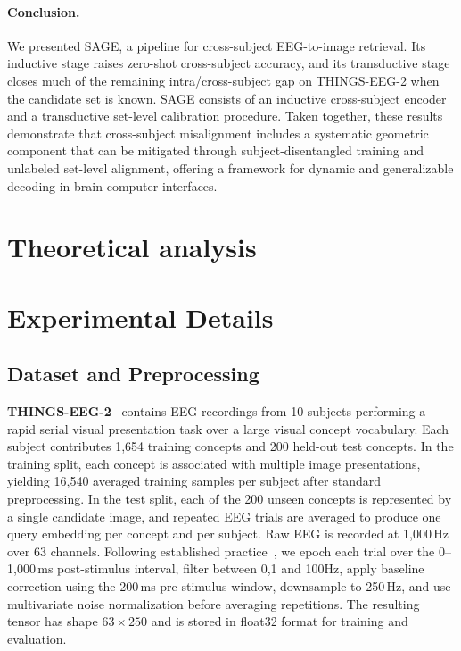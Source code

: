 \documentclass{article}
\begin{document}
\paragraph{Conclusion.}
We presented SAGE, a pipeline for cross-subject EEG-to-image retrieval. Its inductive stage raises zero-shot cross-subject accuracy, and its transductive stage closes much of the remaining intra/cross-subject gap on THINGS-EEG-2 when the candidate set is known. SAGE consists of an inductive cross-subject encoder and a transductive set-level calibration procedure. Taken together, these results demonstrate that cross-subject misalignment includes a systematic geometric component that can be mitigated through subject-disentangled training and unlabeled set-level alignment, offering a framework for dynamic and generalizable decoding in brain-computer interfaces.

\newpage



\newpage


\appendix


\section{Theoretical analysis}


\section{Experimental Details}
\label{app:exp-details}

\subsection{Dataset and Preprocessing}
\label{app:dataset-details}

\textbf{THINGS-EEG-2}~\cite{gifford2022things} contains EEG recordings from 10 subjects performing a rapid serial visual presentation task over a large visual concept vocabulary. Each subject contributes 1{,}654 training concepts and 200 held-out test concepts. In the training split, each concept is associated with multiple image presentations, yielding 16{,}540 averaged training samples per subject after standard preprocessing. In the test split, each of the 200 unseen concepts is represented by a single candidate image, and repeated EEG trials are averaged to produce one query embedding per concept and per subject. Raw EEG is recorded at 1{,}000\,Hz over 63 channels. Following established practice~\cite{song2024nice,li2024atm,wu2025ubp}, we epoch each trial over the 0--1{,}000\,ms post-stimulus interval, filter between 0,1 and 100Hz, apply baseline correction using the 200\,ms pre-stimulus window, downsample to 250\,Hz, and use multivariate noise normalization before averaging repetitions. The resulting tensor has shape $63 \times 250$ and is stored in float32 format for training and evaluation.
\end{document}
